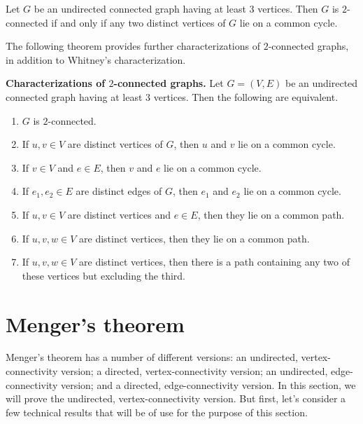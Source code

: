 \begin{corollary}
Let $G$ be an undirected connected graph having at least $3$
vertices. Then $G$ is $2$-connected if and only if any two distinct
vertices of $G$ lie on a common cycle.
\end{corollary}

The following theorem provides further characterizations of
$2$-connected graphs, in addition to Whitney's characterization.

\begin{theorem}
\label{thm:distance_connectivity:characterization_2_connected_graphs}
\textbf{Characterizations of $2$-connected graphs.}
Let $G = (V,E)$ be an undirected connected graph having at least $3$
vertices. Then the following are equivalent.
\begin{enumerate}
\item $G$ is $2$-connected.

\item If $u,v \in V$ are distinct vertices of $G$, then $u$ and $v$
  lie on a common cycle.

\item If $v \in V$ and $e \in E$, then $v$ and $e$ lie on a common
  cycle.

\item If $e_1, e_2 \in E$ are distinct edges of $G$, then $e_1$ and
  $e_2$ lie on a common cycle.

\item If $u,v \in V$ are distinct vertices and $e \in E$, then they
  lie on a common path.

\item If $u,v,w \in V$ are distinct vertices, then they lie on a
  common path.

\item If $u,v,w \in V$ are distinct vertices, then there is a path
  containing any two of these vertices but excluding the third.
\end{enumerate}
\end{theorem}



\section{Menger's theorem}

Menger's theorem has a number of different versions: an undirected,
vertex-connectivity version; a directed, vertex-connectivity version;
an undirected, edge-connectivity version; and a directed,
edge-connectivity version. In this section, we will prove the
undirected, vertex-connectivity version. But first, let's consider a
few technical results that will be of use for the purpose of this
section.

